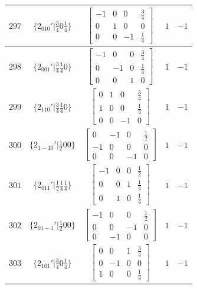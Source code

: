\documentclass[fleqn,8pt]{jsarticle}
\begin{document}
\begin{longtable}{ccccc}
$ 297 $ & $ \{2{}_{010}{}'|\frac{3}{4} 0 \frac{1}{4}\} $ & $ \begin{bmatrix} -1 & 0 & 0 & \frac{3}{4} \\ 0 & 1 & 0 & 0 \\ 0 & 0 & -1 & \frac{1}{4} \end{bmatrix} $ & $ 1 $ & $ -1 $ \\ \hline
$ 298 $ & $ \{2{}_{001}{}'|\frac{3}{4} \frac{1}{4} 0\} $ & $ \begin{bmatrix} -1 & 0 & 0 & \frac{3}{4} \\ 0 & -1 & 0 & \frac{1}{4} \\ 0 & 0 & 1 & 0 \end{bmatrix} $ & $ 1 $ & $ -1 $ \\ \hline
$ 299 $ & $ \{2{}_{110}{}'|\frac{3}{4} \frac{1}{4} 0\} $ & $ \begin{bmatrix} 0 & 1 & 0 & \frac{3}{4} \\ 1 & 0 & 0 & \frac{1}{4} \\ 0 & 0 & -1 & 0 \end{bmatrix} $ & $ 1 $ & $ -1 $ \\ \hline
$ 300 $ & $ \{2{}_{1-10}{}'|\frac{1}{2} 0 0\} $ & $ \begin{bmatrix} 0 & -1 & 0 & \frac{1}{2} \\ -1 & 0 & 0 & 0 \\ 0 & 0 & -1 & 0 \end{bmatrix} $ & $ 1 $ & $ -1 $ \\ \hline
$ 301 $ & $ \{2{}_{011}{}'|\frac{1}{2} \frac{1}{4} \frac{1}{4}\} $ & $ \begin{bmatrix} -1 & 0 & 0 & \frac{1}{2} \\ 0 & 0 & 1 & \frac{1}{4} \\ 0 & 1 & 0 & \frac{1}{4} \end{bmatrix} $ & $ 1 $ & $ -1 $ \\ \hline
$ 302 $ & $ \{2{}_{01-1}{}'|\frac{1}{2} 0 0\} $ & $ \begin{bmatrix} -1 & 0 & 0 & \frac{1}{2} \\ 0 & 0 & -1 & 0 \\ 0 & -1 & 0 & 0 \end{bmatrix} $ & $ 1 $ & $ -1 $ \\ \hline
$ 303 $ & $ \{2{}_{101}{}'|\frac{3}{4} 0 \frac{1}{4}\} $ & $ \begin{bmatrix} 0 & 0 & 1 & \frac{3}{4} \\ 0 & -1 & 0 & 0 \\ 1 & 0 & 0 & \frac{1}{4} \end{bmatrix} $ & $ 1 $ & $ -1 $ \\ \hline

\end{longtable}
\end{document}
